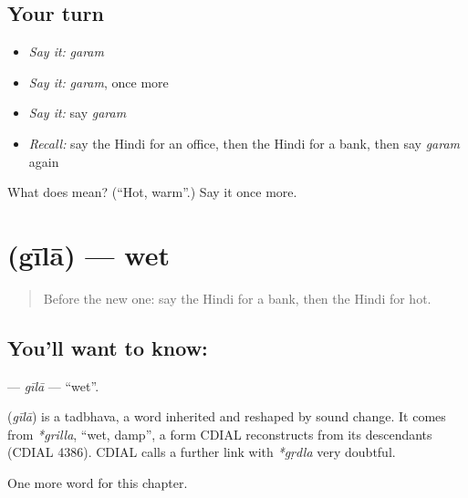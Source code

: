 \subsection*{Your turn}
\begin{itemize}
\raggedright
  \item \emph{Say it:} \emph{garam}
  \item \emph{Say it:} \emph{garam}, once more
  \item \emph{Say it:} say \emph{garam}
  \item \emph{Recall:} say the Hindi for an office, then the Hindi for a bank, then say \emph{garam} again
\end{itemize}

\begin{tcolorbox}[breakable,colback=teal!4,colframe=teal!35!black,title={Before you move on}]
What does  mean? (\textquotedblleft{}Hot, warm\textquotedblright{}.) Say it once more.
\end{tcolorbox}
\section[\texorpdfstring{\hi{गीला} (gīlā)}{गीला (gīlā)}]{ (gīlā) — wet}

\label{lesson:HI-C154-gila}



\begin{quote}
Before the new one: say the Hindi for a bank, then the Hindi for hot.
\end{quote}

\subsection*{You'll want to know: }
\textbf{} — \emph{gīlā} — \textquotedblleft{}wet\textquotedblright{}.

\begin{cousinweb}
\textbf{} (\emph{gīlā}) is a tadbhava, a word inherited and reshaped by sound change. It comes from \emph{*grilla}, \textquotedblleft{}wet, damp\textquotedblright{}, a form CDIAL reconstructs from its descendants (CDIAL 4386). CDIAL calls a further link with \emph{*gṛdla} very doubtful.
\end{cousinweb}

\begin{grammarlens}[title={What you've built}]
One more word for this chapter.
\end{grammarlens}

